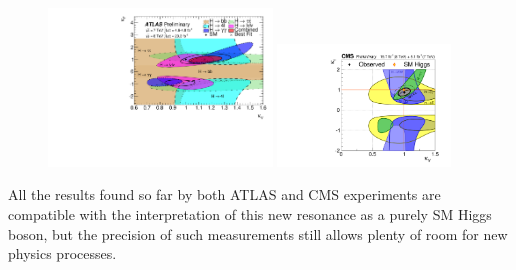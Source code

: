 \begin{figure}
        \centering
	\includegraphics[width=0.53\textwidth]{1_Introduction_Th_and_Exp/pics/fig_05b.pdf}
	\includegraphics[width=0.41\textwidth]{1_Introduction_Th_and_Exp/pics/cVcF_all_channels_2quadrant.pdf}
       \caption{ }
       \label{fig:kvf}
\end{figure}

All the results found so far by both ATLAS and CMS experiments are compatible with the interpretation of this new resonance as a purely SM Higgs boson, but the precision of such measurements still allows plenty of room for new physics processes.



